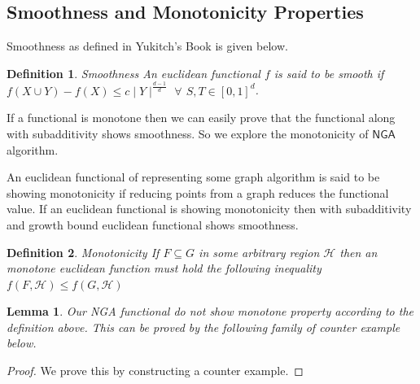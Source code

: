 \documentclass{article}
\theoremstyle{define}
\newtheorem{define}{Definition}[section]
\newtheorem{lemma}[theorem]{Lemma}
\theoremstyle{remark}
\begin{document}


\subsection{Smoothness and Monotonicity Properties}

Smoothness as defined in Yukitch's Book is given below.

\begin{define}{Smoothness}
    \textit{An euclidean functional $f$ is said to be smooth if $f(X \cup Y) - f(X)\leq c\mid Y\mid^{\frac{d-1}{d}}$
        $\forall$ $S, T \in \left[0,1 \right]^d$}.
\end{define}

If a functional is monotone then we can easily prove that the functional along
with subadditivity shows smoothness. So we explore the monotonicity of
$\textsf{NGA}$ algorithm.

An euclidean functional of representing some graph algorithm is said to be showing monotonicity if reducing points from a graph reduces the functional value.
If an euclidean functional is showing monotonicity then with subadditivity and growth bound euclidean functional shows smoothness.

\begin{define}{Monotonicity}
    \textit{If $F \subseteq G$ in some arbitrary region $\mathcal{H}$ then an monotone euclidean function
    must hold the following inequality $f(F, \mathcal{H}) \leq f(G, \mathcal{H})$}
\end{define}

\begin{lemma}
    Our \textsf{NGA} functional do not show monotone property according to the definition above. This can be proved
    by the following family of counter example below.
\end{lemma}

\begin{proof}
    We prove this by constructing a counter example.
\end{proof}
\end{document}
